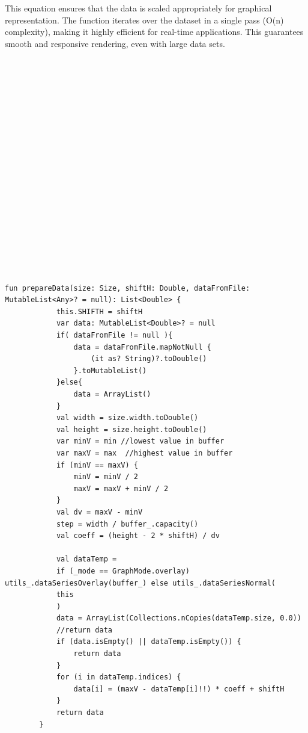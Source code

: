 {{	This equation ensures that the data is scaled appropriately for graphical representation.
	The function iterates over the dataset in a single pass (O(n) complexity), making it highly efficient for real-time applications. This guarantees smooth and responsive rendering, even with large data sets.
	\mbox{}\\
	\mbox{}\\
	\mbox{}\\
	\mbox{}\\
	\mbox{}\\
	\mbox{}\\
	\mbox{}\\
	\mbox{}\\
	\mbox{}\\
	\mbox{}\\
	\mbox{}\\
	\mbox{}\\
	\mbox{}\\
	\mbox{}\\
	\mbox{}\\
	\mbox{}\\
	\mbox{}\\
	\mbox{}\\
	\mbox{}\\
	\mbox{}\\
	\begin{lstlisting}[label={fig:simpleSourceGen.cs}, caption={Code for mapping data on the screen}]
		fun prepareData(size: Size, shiftH: Double, dataFromFile: MutableList<Any>? = null): List<Double> {
			this.SHIFTH = shiftH
			var data: MutableList<Double>? = null
			if( dataFromFile != null ){
				data = dataFromFile.mapNotNull {
					(it as? String)?.toDouble()
				}.toMutableList()
			}else{
				data = ArrayList()
			}
			val width = size.width.toDouble()
			val height = size.height.toDouble()
			var minV = min //lowest value in buffer
			var maxV = max  //highest value in buffer
			if (minV == maxV) {
				minV = minV / 2
				maxV = maxV + minV / 2
			}
			val dv = maxV - minV
			step = width / buffer_.capacity()
			val coeff = (height - 2 * shiftH) / dv
		
			val dataTemp =
			if (_mode == GraphMode.overlay) utils_.dataSeriesOverlay(buffer_) else utils_.dataSeriesNormal(
			this
			)
			data = ArrayList(Collections.nCopies(dataTemp.size, 0.0))
			//return data
			if (data.isEmpty() || dataTemp.isEmpty()) {
				return data
			}
			for (i in dataTemp.indices) {
				data[i] = (maxV - dataTemp[i]!!) * coeff + shiftH
			}
			return data
		}
	\end{lstlisting}
	
}}
